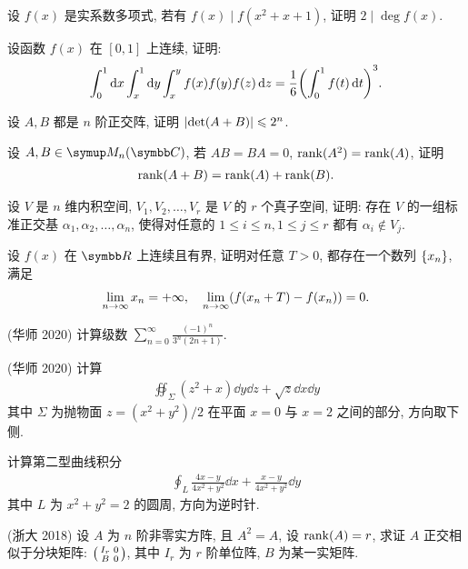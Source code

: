 \begin{exercise}[resume=exer]
\begin{exercise}
        \end{exercise}
        \item 设 $ f(x) $ 是实系数多项式, 若有 $ f(x) \mid f(x^2 + x + 1) $, 证明 $ 2 \mid \deg f(x) $.
        \item 设函数 $ f(x) $ 在 $ [0, 1] $ 上连续, 证明:
        \begin{align*}
            \int_{0}^{1} \dd{x}\int_{x}^{1} \dd{y}\int_{x}^{y}f(x)f(y)f(z)\dd{z} = \frac{1}{6}\qty(\int_{0}^{1}f(t) \dd{t})^{3}.
        \end{align*}
        \item 设 $ A, B $ 都是 $ n $ 阶正交阵, 证明 $ \abs{\det(A+B)} \leqslant 2^{n} $.
        \item 设 $ A, B \in \MM[\C] $, 若 $ AB = BA = 0 $, $ \rank(A^{2}) = \rank(A) $, 证明
        \begin{align*}
            \rank(A+B) = \rank(A) + \rank(B).
        \end{align*}
        \item 设 $ V $ 是 $ n $ 维内积空间,  $ V_{1}, V_{2}, \dots, V_{r} $ 是 $ V $ 的 $ r $ 个真子空间, 证明: 存在 $ V $ 的一组标准正交基 $ \alpha_{1}, \alpha_{2}, \dots, \alpha_{n} $, 使得对任意的 $ 1 \le i \le n, 1\le j \le r $ 都有 $ \alpha_{i} \notin V_{j} $. 
        \item 设 $ f(x) $ 在 $ \R $ 上连续且有界, 证明对任意 $ T > 0 $, 都存在一个数列 $ \qty{x_{n}} $, 满足
        \begin{align*}
            \lim_{n \to \infty} x_{n} = +\infty, \quad \lim_{n \to \infty}(f(x_{n}+T) - f(x_{n})) = 0.
        \end{align*}
        \item (华师 2020) 计算级数 $ \sum_{n=0}^{\infty}\frac{(-1)^{n}}{3^{n}(2n+1)} $.
        \item (华师 2020) 计算
        \begin{align*}
            \oiint_{\Sigma} (z^{2}+x) \dd{y}\dd{z} + \sqrt{z} \dd{x}\dd{y}
        \end{align*}
        其中 $ \Sigma $ 为抛物面 $ z = (x^{2}+y^{2})/2 $ 在平面 $ x=0 $ 与 $ x=2 $ 之间的部分, 方向取下侧.
        \item 计算第二型曲线积分
        \begin{align*}
            \oint_{L} \frac{4x-y}{4x^{2}+y^{2}}\dd{x} + \frac{x-y}{4x^{2}+y^{2}}\dd{y}
        \end{align*}
        其中 $ L $ 为 $ x^{2} + y^{2} = 2 $ 的圆周, 方向为逆时针.
        \item (浙大 2018) 设 $ A $ 为 $ n $ 阶非零实方阵, 且 $ A^{2} = A $, 设 $ \rank(A) = r $, 求证 $ A $ 正交相似于分块矩阵: $ \smqty(I_{r} & 0 \\ B & 0) $, 其中 $ I_{r} $ 为 $ r $ 阶单位阵, $ B $ 为某一实矩阵.

\end{exercise}
